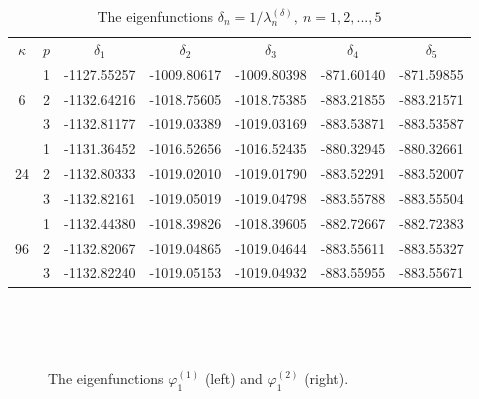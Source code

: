 \documentclass[authoryear]{elsarticle}
\begin{document}
\begin{table}[h]
\caption{The eigenfunctions $\delta_n = 1 / \lambda_n^{(\delta )}, \ n = 1,2,...,5$}
\label{t-8}
\begin{center}
\begin{tabular}{ccccccc}
\rowcolor{col1}
$\kappa$ & $p$ & $\delta_1$ &  $\delta_2$ &  $\delta_3$ &  $\delta_4$ &  $\delta_5$ \\ 
\rowcolor{col3}
   & 1 & -1127.55257 & -1009.80617 & -1009.80398 & -871.60140 & -871.59855 \\
\rowcolor{col2}
6  & 2 & -1132.64216 & -1018.75605 & -1018.75385 & -883.21855 & -883.21571 \\
\rowcolor{col1}
   & 3 & -1132.81177 & -1019.03389 & -1019.03169 & -883.53871 & -883.53587 \\
\rowcolor{col3}
   & 1 & -1131.36452 & -1016.52656 & -1016.52435 & -880.32945 & -880.32661 \\
\rowcolor{col2}
24 & 2 & -1132.80333 & -1019.02010 & -1019.01790 & -883.52291 & -883.52007 \\
\rowcolor{col1}
   & 3 & -1132.82161 & -1019.05019 & -1019.04798 & -883.55788 & -883.55504 \\
\rowcolor{col3}
   & 1 & -1132.44380 & -1018.39826 & -1018.39605 & -882.72667 & -882.72383 \\
\rowcolor{col2}
96 & 2 & -1132.82067 & -1019.04865 & -1019.04644 & -883.55611 & -883.55327 \\
\rowcolor{col1}
   & 3 & -1132.82240 & -1019.05153 & -1019.04932 & -883.55955 & -883.55671 \\
\end{tabular}
\end{center}
\end{table}

\begin{figure}[h]
  \begin{center}
\begin{minipage}{0.49\linewidth}
 \\
\end{minipage}
\hfill
\begin{minipage}{0.49\linewidth}
 \\
\end{minipage}
\caption{The eigenfunctions $\varphi^{(1)}_1$ (left) and $\varphi^{(2)}_1$ (right).}
\label{fig:20}
  \end{center}
\end{figure}
\end{document}
